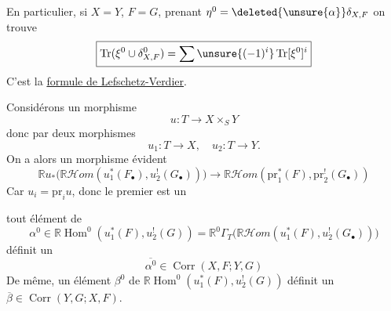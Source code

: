 En particulier, si $X=Y$, $F=G$, prenant $\eta^0=\deleted{\unsure{\alpha}}\delta_{X,F}$ on trouve
\[
\boxed{\operatorname{Tr}(\xi^0\cup\delta_{X,F}^{0})=\sum\unsure{(-1)^i}\operatorname{Tr}[\xi^0]^i}
\]
C'est la \uline{formule de Lefschetz-Verdier}.

\deleted{\unsure{\S}}
Considérons un morphisme
\[
u:T\longrightarrow X\times_S Y
\]
 donc par deux morphismes
\[
u_1:T\longrightarrow X,\quad u_2:T\longrightarrow Y.
\]
On a alors un morphisme évident
\[
\mathbb{R}u_*\bigl(\mathbb{R}\mathcal{H}om(u_1^*(F_\bullet),u_2^!(G_\bullet))\bigr)
\longrightarrow\mathbb{R}\mathcal{H}om(\mathrm{pr}_1^*(F),\mathrm{pr}_2^!(G_\bullet))
\]
Car $u_i=\mathrm{pr}_i u$, donc le premier est un

 tout élément de 
\[
\alpha^0\in\mathbb{R}\operatorname{Hom}^{0}(u_1^*(F),u_2^!(G))
=\mathbb{R}^{0}\Gamma_T\bigl(\mathbb{R}\mathcal{H}om(u_1^*(F),u_2^!(G_\bullet))\bigr)
\]
définit un 
\[
\overline{\alpha^0}\in\operatorname{Corr}(X,F;Y,G)
\]
De même, un élément $\beta^0$ de $\mathbb{R}\operatorname{Hom}^{0}(u_1^*(F),u_2^!(G))$ définit un  $\overline{\beta}\in\operatorname{Corr}(Y,G;X,F)$.
